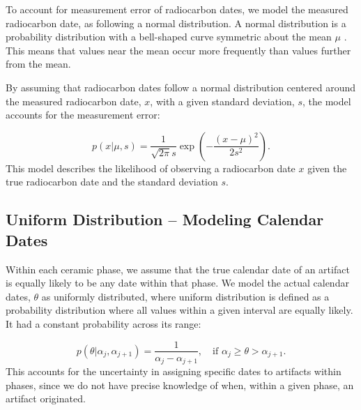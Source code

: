 \documentclass{article}
\begin{document}
To account for measurement error of radiocarbon dates, we model the measured radiocarbon date, as following a normal distribution. A normal distribution is a probability distribution with a bell-shaped curve symmetric about the mean $\mu$ \cite{normaldistribution}. This means that values near the mean occur more frequently than values further from the mean.

By assuming that radiocarbon dates follow a normal distribution centered around the measured radiocarbon date, $x$, with a given standard deviation, $s$, the model accounts for the measurement error:

\begin{equation}
    p(x|\mu, s)=\frac{1}{\sqrt{2\pi }s}\exp(-\frac{(x-\mu)^2}{2s^2}).
\end{equation}
This model describes the likelihood of observing a radiocarbon date $x$ given the true radiocarbon date and the standard deviation $s$.

\subsection{Uniform Distribution -- Modeling Calendar Dates}
Within each ceramic phase, we assume that the true calendar date of an artifact is equally likely to be any date within that phase. We model the actual calendar dates, $\theta$ as uniformly distributed, where uniform distribution is defined as a probability distribution where all values within a given interval are equally likely. It had a constant probability across its range:

\begin{equation}
        p(\theta|\alpha_j,\alpha_{j+1})=\frac{1}{\alpha_j-\alpha_{j+1}}, \quad \text{if  } \alpha_j\ge\theta>\alpha_{j+1}.
\end{equation}
This accounts for the uncertainty in assigning specific dates to artifacts within phases, since we do not have precise knowledge of when, within a given phase, an artifact originated.
\end{document}
